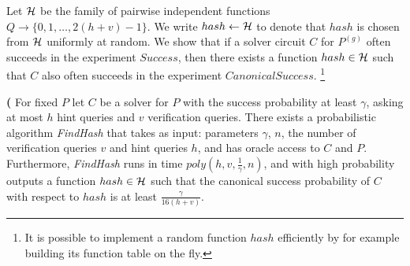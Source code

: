 Let $\mathcal{H}$ be the family of pairwise independent functions $Q \rightarrow \{0,1, \dots,2(h+v)-1\}$.
We write $hash \leftarrow \mathcal{H}$ to denote that $hash$ is chosen from $\mathcal{H}$ uniformly at random.
We show that if a solver circuit $C$ for $P^{(g)}$ often succeeds in the experiment $Success$,
then there exists a function $hash \in \mathcal{H}$ such that $C$ also often succeeds in the experiment $CanonicalSuccess$.
\footnote{It is possible to implement a random function $hash$ efficiently by for example building its function table on the fly.}
%
%
\begin{lemma}\textbf{(}
\label{lemma:hash_function_probability}
For fixed $P$ let $C$ be a solver for $P$ with the success probability at least $\gamma$,
asking at most $h$ hint queries and $v$ verification queries.
There exists a probabilistic algorithm \textit{FindHash} that takes as input:
parameters $\gamma$, $n$, the number of verification queries $v$ and hint queries $h$, and has
oracle access to $C$ and $P$. Furthermore, \textit{FindHash} runs in time $poly(h,v,\frac{1}{\gamma},n)$,
and with high probability outputs a function $hash \in \mathcal{H}$
such that the canonical success probability of $C$ with respect to $hash$ is at least $\frac{\gamma}{16(h+v)}$.
\end{lemma}
%

